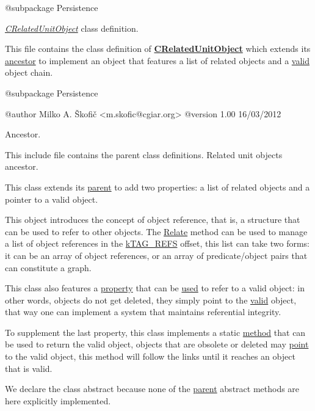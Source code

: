 \begin{DoxyVerb}    @subpackage     Persistence\end{DoxyVerb}


{\itshape \hyperlink{class_c_related_unit_object}{C\-Related\-Unit\-Object}} class definition.

This file contains the class definition of {\bfseries \hyperlink{class_c_related_unit_object}{C\-Related\-Unit\-Object}} which extends its \hyperlink{class_c_persistent_unit_object}{ancestor} to implement an object that features a list of related objects and a \hyperlink{}{valid} object chain.

\begin{DoxyVerb}    @subpackage     Persistence

    @author         Milko A. Škofič <m.skofic@cgiar.org>
    @version        1.00 16/03/2012\end{DoxyVerb}


Ancestor.

This include file contains the parent class definitions. Related unit objects ancestor.

This class extends its \hyperlink{class_c_persistent_unit_object}{parent} to add two properties\-: a list of related objects and a pointer to a valid object.

This object introduces the concept of object reference, that is, a structure that can be used to refer to other objects. The \hyperlink{}{Relate} method can be used to manage a list of object references in the \hyperlink{}{k\-T\-A\-G\-\_\-\-R\-E\-F\-S} offset, this list can take two forms\-: it can be an array of object references, or an array of predicate/object pairs that can constitute a graph.

This class also features a \hyperlink{}{property} that can be \hyperlink{}{used} to refer to a valid object\-: in other words, objects do not get deleted, they simply point to the \hyperlink{}{valid} object, that way one can implement a system that maintains referential integrity.

To supplement the last property, this class implements a static \hyperlink{}{method} that can be used to return the valid object, objects that are obsolete or deleted may \hyperlink{}{point} to the valid object, this method will follow the links until it reaches an object that is valid.

We declare the class abstract because none of the \hyperlink{class_c_persistent_unit_object}{parent} abstract methods are here explicitly implemented.

